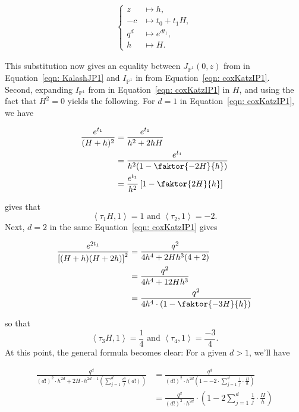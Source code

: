 \documentclass{amsart}
\newcommand{\PP}{\mathbb{P}}\newcommand{\A}{\mathbb{A}}\newcommand{\Z}{\mathbb{Z}}\newcommand{\C}{\mathbb{C}}\newcommand{\N}{\mathbb{N}}\newcommand{\T}{\mathbb{T}}
\begin{document}
\begin{align*} \begin{cases} 
    z &\mapsto h, \\
    -c &\mapsto t_0 + t_1H, \\
    q^d &\mapsto e^{dt_1},\\
    h &\mapsto H. \end{cases} 
\end{align*}

This substitution now gives an equality between $J_{\PP^1}(0,z)$ from \cite{Kalashnikov} in Equation~\ref{eqn: KalashJP1} and $I_{\PP^1}$ in \cite{coxkatxMSAG} from Equation~\ref{eqn: coxKatzIP1}.\\


Second, expanding $I_{\PP^1}$ from \cite{coxkatxMSAG} in Equation~\ref{eqn: coxKatzIP1} in $H$, and using the fact that $H^2=0$ yields the following. For $d=1$ in Equation~\ref{eqn: coxKatzIP1}, we have 

\begin{align*}
\frac{e^{t_1}}{(H+h)^2} &= \frac{ e^{t_1}}{h^2 + 2hH}\\
&= \frac{ e^{t_1}}{h^2(1 - \faktor{-2H}{h})} \\
&= \frac{e^{t_1}}{h^2} \left[ 1 - \faktor{2H}{h} \right] \end{align*}

gives that \[ \left< \tau_1 H, 1\right>=1 \text{ and }\left< \tau_2, 1\right> = -2. \] Next, $d=2$ in the same Equation~\ref{eqn: coxKatzIP1} gives 

\begin{align*}
\frac{e^{2t_1}}{\left[(H+h)(H+2h)\right]^2} &= \frac{q^2}{ 4h^4 + 2Hh^3(4+2)}\\
&= \frac{q^2}{4h^4 + 12Hh^3}\\
&= \frac{q^2}{4h^4 \cdot (1 - \faktor{-3H}{h} ) }   
\end{align*} 

so that  \[ \left<\tau_3 H,1\right> = \frac{1}{4} \text{  and } \left< \tau_4, 1\right> = \frac{-3}{4}.\] At this point, the general formula becomes clear: For a given $d>1$, we'll have

\begin{align*}
\frac{q^d}{(d!)^2\cdot h^{2d} + 2H\cdot h^{2d-1}\left( \sum_{j=1}^d \frac{d!}{j}(d!) \right)} &= \frac{ q^d }{(d!)^2 \cdot h^{2d} \left( 1 - -2\cdot \sum_{j=1}^d \frac{1}{j} \cdot \frac{H}{h} \right) }\\
&= \frac{q^d}{(d!)^2 \cdot h^{2d} } \cdot \left( 1 - 2\sum_{j=1}^d \frac{1}{j} \cdot \frac{H}{h} \right) \end{align*} 
\end{document}
